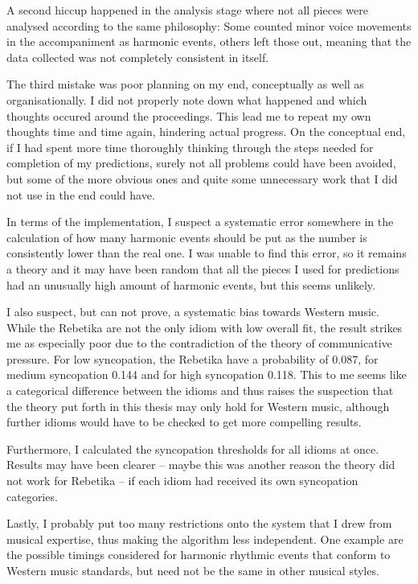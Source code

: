 \documentclass[a4paper,12pt]{report}
\begin{document}
A second hiccup happened in the analysis stage where not all pieces were analysed according to the same philosophy: Some counted minor voice movements in the accompaniment as harmonic events, others left those out, meaning that the data collected was not completely consistent in itself.

The third mistake was poor planning on my end, conceptually as well as organisationally. I did not properly note down what happened and which thoughts occured around the proceedings. This lead me to repeat my own thoughts time and time again, hindering actual progress. On the conceptual end, if I had spent more time thoroughly thinking through the steps needed for completion of my predictions, surely not all problems could have been avoided, but some of the more obvious ones and quite some unnecessary work that I did not use in the end could have.

In terms of the implementation, I suspect a systematic error somewhere in the calculation of how many harmonic events should be put as the number is consistently lower than the real one. I was unable to find this error, so it remains a theory and it may have been random that all the pieces I used for predictions had an unusually high amount of harmonic events, but this seems unlikely.

I also suspect, but can not prove, a systematic bias towards Western music. While the Rebetika are not the only idiom with low overall fit, the result strikes me as especially poor due to the contradiction of the theory of communicative pressure. For low syncopation, the Rebetika have a probability of 0.087, for medium syncopation 0.144 and for high syncopation 0.118. This to me seems like a categorical difference between the idioms and thus raises the suspection that the theory put forth in this thesis may only hold for Western music, although further idioms would have to be checked to get more compelling results.

Furthermore, I calculated the syncopation thresholds for all idioms at once. Results may have been clearer -- maybe this was another reason the theory did not work for Rebetika -- if each idiom had received its own syncopation categories.

Lastly, I probably put too many restrictions onto the system that I drew from musical expertise, thus making the algorithm less independent. One example are the possible timings considered for harmonic rhythmic events that conform to Western music standards, but need not be the same in other musical styles.
\end{document}
